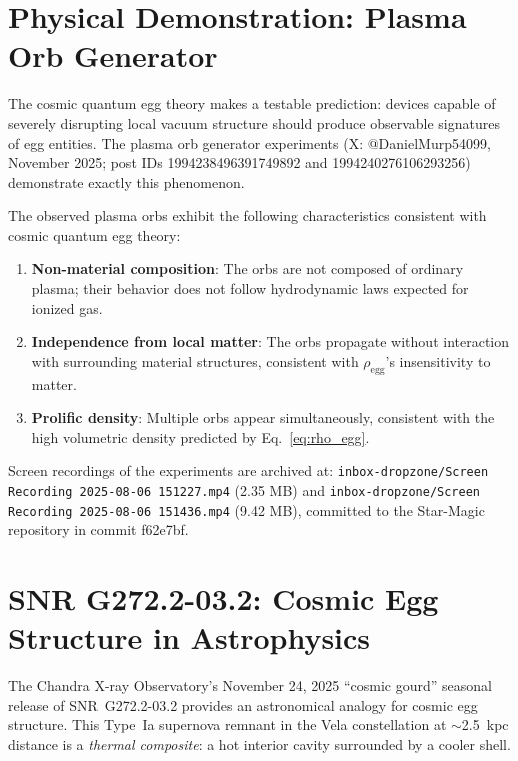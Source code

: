 \documentclass[12pt]{article}
\begin{document}
\section{Physical Demonstration: Plasma Orb Generator}

The cosmic quantum egg theory makes a testable prediction: devices capable of
severely disrupting local vacuum structure should produce observable signatures
of egg entities. The plasma orb generator experiments (X: @DanielMurp54099,
November 2025; post IDs 1994238496391749892 and 1994240276106293256) demonstrate
exactly this phenomenon.

The observed plasma orbs exhibit the following characteristics consistent with
cosmic quantum egg theory:
\begin{enumerate}
    \item \textbf{Non-material composition}: The orbs are not composed of
          ordinary plasma; their behavior does not follow hydrodynamic laws
          expected for ionized gas.
    \item \textbf{Independence from local matter}: The orbs propagate without
          interaction with surrounding material structures, consistent with
          $\rho_\text{egg}$'s insensitivity to matter.
    \item \textbf{Prolific density}: Multiple orbs appear simultaneously,
          consistent with the high volumetric density predicted by
          Eq.~\eqref{eq:rho_egg}.
\end{enumerate}

Screen recordings of the experiments are archived at:
\verb|inbox-dropzone/Screen Recording 2025-08-06 151227.mp4| (2.35 MB) and
\verb|inbox-dropzone/Screen Recording 2025-08-06 151436.mp4| (9.42 MB),
committed to the Star-Magic repository in commit f62e7bf.

\section{SNR G272.2-03.2: Cosmic Egg Structure in Astrophysics}

The Chandra X-ray Observatory's November 24, 2025 ``cosmic gourd'' seasonal
release of SNR~G272.2-03.2 provides an astronomical analogy for cosmic egg
structure. This Type~Ia supernova remnant in the Vela constellation at
$\sim$2.5~kpc distance is a \emph{thermal composite}: a hot interior cavity
surrounded by a cooler shell.
\end{document}
